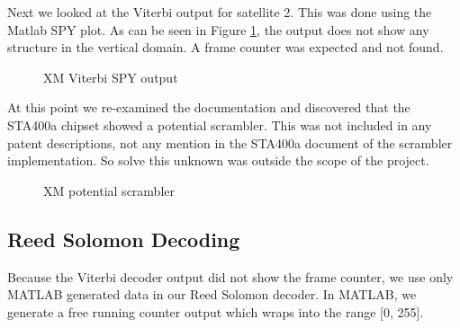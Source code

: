 \documentclass[conference,onecolumn]{IEEEtran}
\begin{document}
Next we looked at the Viterbi output for satellite 2.  This was done using the Matlab SPY plot.  As can be seen in Figure \ref{fig::Viterbi_spy}, the output does not show any structure in the vertical domain.  A frame counter was expected and not found.  
\begin{figure}[H]
	\centerline{}
	\caption{XM Viterbi SPY output}
	\label{fig::Viterbi_spy}
\end{figure}
At this point we re-examined the documentation and discovered that the STA400a chipset showed a potential scrambler.  This was not included in any patent descriptions, not any mention in the STA400a document of the scrambler implementation.  So solve this unknown was outside the scope of the project.

\begin{figure}[H]
	\centerline{}
	\caption{XM potential scrambler}
	\label{fig::scrambler}
\end{figure}

\subsection{Reed Solomon Decoding}

Because the Viterbi decoder output did not show the frame counter, we use only MATLAB generated data in our Reed Solomon decoder. In MATLAB, we generate a free running counter output which wraps into the range [0, 255].
\end{document}

